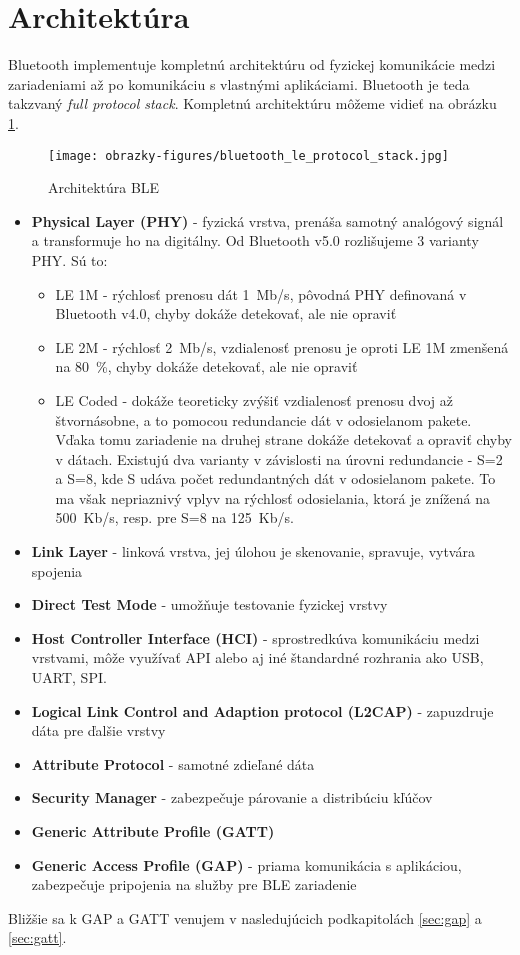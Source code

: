 \section{Architektúra} \label{sec:arch}
Bluetooth implementuje kompletnú architektúru od fyzickej komunikácie medzi zariadeniami až po komunikáciu s vlastnými aplikáciami. Bluetooth je teda takzvaný \textit{full protocol stack}. Kompletnú architektúru môžeme vidieť na obrázku \ref{fig:ble_stack}.

\begin{figure}[ht]
    \centering
    \texttt{[image: obrazky-figures/bluetooth\_le\_protocol\_stack.jpg]}
    \caption{Architektúra BLE\cite{bluetooth}}
    \label{fig:ble_stack}
\end{figure}

\begin{itemize}
    \item \textbf{Physical Layer (PHY)} - fyzická vrstva, prenáša samotný analógový signál a transformuje ho na digitálny. Od Bluetooth v5.0 rozlišujeme 3 varianty PHY. Sú to:
    \begin{itemize}
        \item LE 1M - rýchlosť prenosu dát 1~Mb/s, pôvodná PHY definovaná v Bluetooth v4.0, chyby dokáže detekovať, ale nie opraviť
        \item LE 2M - rýchlosť 2~Mb/s, vzdialenosť prenosu je oproti LE 1M zmenšená na 80~\%, chyby dokáže detekovať, ale nie opraviť
        \item LE Coded - dokáže teoreticky zvýšiť vzdialenosť prenosu dvoj až štvornásobne, a to pomocou redundancie dát v odosielanom pakete. Vďaka tomu zariadenie na druhej strane dokáže detekovať a opraviť chyby v dátach. Existujú dva varianty v závislosti na úrovni redundancie - S=2 a S=8, kde S udáva počet redundantných dát v odosielanom pakete. To ma však nepriaznivý vplyv na rýchlosť odosielania, ktorá je znížená na 500~Kb/s, resp. pre S=8 na 125~Kb/s. 
    \end{itemize}
    \item \textbf{Link Layer} - linková vrstva, jej úlohou je skenovanie, spravuje, vytvára spojenia
    \item \textbf{Direct Test Mode} - umožňuje testovanie fyzickej vrstvy
    \item \textbf{Host Controller Interface (HCI)} - sprostredkúva komunikáciu medzi vrstvami, môže využívať API alebo aj iné štandardné rozhrania ako USB, UART, SPI. 
    \item \textbf{Logical Link Control and Adaption protocol (L2CAP)} - zapuzdruje dáta pre ďalšie vrstvy
    \item \textbf{Attribute Protocol} - samotné zdieľané dáta
    \item \textbf{Security Manager} - zabezpečuje párovanie a distribúciu kľúčov
    \item \textbf{Generic Attribute Profile (GATT)}
    \item \textbf{Generic Access Profile (GAP)} - priama komunikácia s aplikáciou, zabezpečuje pripojenia na služby pre BLE zariadenie
    \cite{bluetooth}\cite{ble-arch}
\end{itemize}
Bližšie sa k GAP a GATT venujem v nasledujúcich podkapitolách \ref{sec:gap} a \ref{sec:gatt}.

